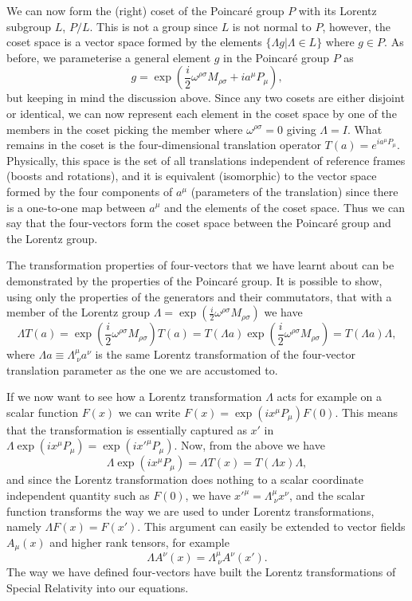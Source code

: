 \documentclass[notes.tex]{subfiles}
\begin{document}
We can now form the (right) coset of the Poincaré group $P$ with its Lorentz subgroup $L$, $P/L$. This is not a group since $L$ is not normal to $P$, however, the coset space is a vector space formed by the elements $\{ \Lambda g | \Lambda \in L\}$ where $g\in P$. As before, we parameterise a general element $g$ in the Poincaré group $P$ as
\begin{equation*}
g=\exp\left(\frac{i}{2}\omega^{\rho \sigma}M_{\rho \sigma}+ia^\mu P_\mu\right),
\end{equation*}
but keeping in mind the discussion above. Since any two cosets are either disjoint or identical, we can now represent each element in the coset space by one of the members in the coset picking the member where $\omega^{\rho \sigma}=0$ giving $\Lambda=I$. What remains in the coset is the four-dimensional translation operator $T(a)=e^{ia^\mu P_\mu}$.  Physically, this space is the set of all translations independent of reference frames (boosts and rotations), and it is equivalent (isomorphic) to the vector space formed by the four components of $a^\mu$ (parameters of the translation) since there is a one-to-one map between $a^\mu$  and the elements of the coset space. Thus we can say that the four-vectors form the coset space between the Poincaré group and the Lorentz group.

The transformation properties of four-vectors that we have learnt about can be demonstrated by the properties of the Poincaré group. It is possible to show, using only the properties of the generators and their commutators,  that with a member of the Lorentz group $\Lambda=\exp(\frac{i}{2}\omega^{\rho \sigma}M_{\rho \sigma})$ we have
\[ \Lambda T(a) = \exp\left(\frac{i}{2}\omega^{\rho \sigma}M_{\rho \sigma}\right)T(a)=T(\Lambda a) \exp\left(\frac{i}{2}\omega^{\rho \sigma}M_{\rho \sigma}\right) =T(\Lambda a) \Lambda, \]
where $\Lambda a \equiv \Lambda^\mu_{~\nu} a^\nu$ is the same Lorentz transformation of the four-vector translation parameter as the one we are accustomed to.

If we now want to see how a Lorentz transformation $\Lambda$ acts for example on a scalar function $F(x)$  we can write $F(x)=\exp(ix^\mu P_\mu)F(0)$. This means that the transformation is essentially captured as $x'$ in $\Lambda\exp(ix^\mu P_\mu)= \exp(ix'^\mu P_\mu)$. Now, from the above we have
\[ \Lambda\exp(ix^\mu P_\mu)=\Lambda T(x)=T(\Lambda x) \Lambda, \]
and since the Lorentz transformation does nothing to a scalar coordinate independent quantity such as $F(0)$, we have $x'^\mu=\Lambda^\mu_{~\nu} x^\nu$, and the scalar function transforms the way we are used to under Lorentz transformations, namely $\Lambda F(x)= F(x')$. This argument can easily be extended to vector fields $A_\mu(x)$ and higher rank tensors, for example
\[ \Lambda A^\nu(x)= \Lambda^\mu_{~\nu} A^\nu(x'). \]
 The way we have defined four-vectors have built the Lorentz transformations of Special Relativity into our equations.
 
\end{document}
